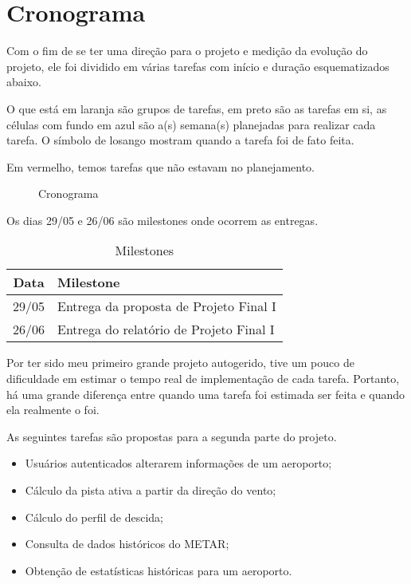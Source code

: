 \chapter{Cronograma}

Com o fim de se ter uma direção para o projeto e medição da
evolução do projeto, ele foi dividido em várias tarefas com
início e duração esquematizados abaixo.

O que está em laranja são grupos de tarefas, em preto são as
tarefas em si, as células com fundo em azul são a(s) semana(s) 
planejadas para realizar cada tarefa. O símbolo de losango
mostram quando a tarefa foi de fato feita.

Em vermelho, temos tarefas que não estavam no planejamento.

\begin{figure}[ht]
    \begin{center}
    
    \caption{Cronograma}
    \label{fig:cronograma-planejado}
    \end{center}
\end{figure}

Os dias 29/05 e 26/06 são milestones onde ocorrem as entregas.

\begin{table}[h]
    \centering
    \caption{Milestones}
    \begin{tabular}{|c|l|}
        \hline
        \textbf{Data} & \textbf{Milestone} \\
        \hline
        29/05 & Entrega da proposta de Projeto Final I \\
        26/06 & Entrega do relatório de Projeto Final I \\
        \hline
    \end{tabular}
\end{table}

Por ter sido meu primeiro grande projeto autogerido, tive um pouco de dificuldade em 
estimar o tempo real de implementação de cada tarefa. Portanto, há uma grande diferença entre
quando uma tarefa foi estimada ser feita e quando ela realmente o foi.

As seguintes tarefas são propostas para a segunda parte do projeto.

\begin{itemize}
    \item Usuários autenticados alterarem informações de um aeroporto;
    \item Cálculo da pista ativa a partir da direção do vento;
    \item Cálculo do perfil de descida;
    \item Consulta de dados históricos do METAR;
    \item Obtenção de estatísticas históricas para um aeroporto.
\end{itemize}

